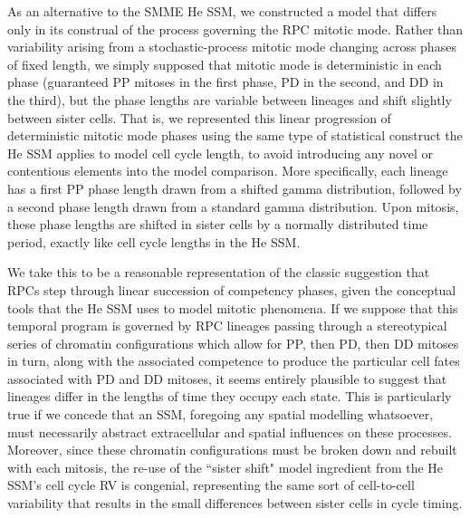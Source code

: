 As an alternative to the SMME He SSM, we constructed a model that differs only in its construal of the process governing the RPC mitotic mode. Rather than variability arising from a stochastic-process mitotic mode changing across phases of fixed length, we simply supposed that mitotic mode is deterministic in each phase (guaranteed PP mitoses in the first phase, PD in the second, and DD in the third), but the phase lengths are variable between lineages and shift slightly between sister cells. That is, we represented this linear progression of deterministic mitotic mode phases using the same type of statistical construct the He SSM applies to model cell cycle length, to avoid introducing any novel or contentious elements into the model comparison. More specifically, each lineage has a first PP phase length drawn from a shifted gamma distribution, followed by a second phase length drawn from a standard gamma distribution. Upon mitosis, these phase lengths are shifted in sister cells by a normally distributed time period, exactly like cell cycle lengths in the He SSM.

We take this to be a reasonable representation of the classic suggestion that RPCs step through linear succession of competency phases, given the conceptual tools that the He SSM uses to model mitotic phenomena. If we suppose that this temporal program is governed by RPC lineages passing through a stereotypical series of chromatin configurations which allow for PP, then PD, then DD mitoses in turn, along with the associated competence to produce the particular cell fates associated with PD and DD mitoses, it seems entirely plausible to suggest that lineages differ in the lengths of time they occupy each state. This is particularly true if we concede that an SSM, foregoing any spatial modelling whatsoever, must necessarily abstract extracellular and spatial influences on these processes. Moreover, since these chromatin configurations must be broken down and rebuilt with each mitosis, the re-use of the ``sister shift" model ingredient from the He SSM's cell cycle RV is congenial, representing the same sort of cell-to-cell variability that results in the small differences between sister cells in cycle timing. 


